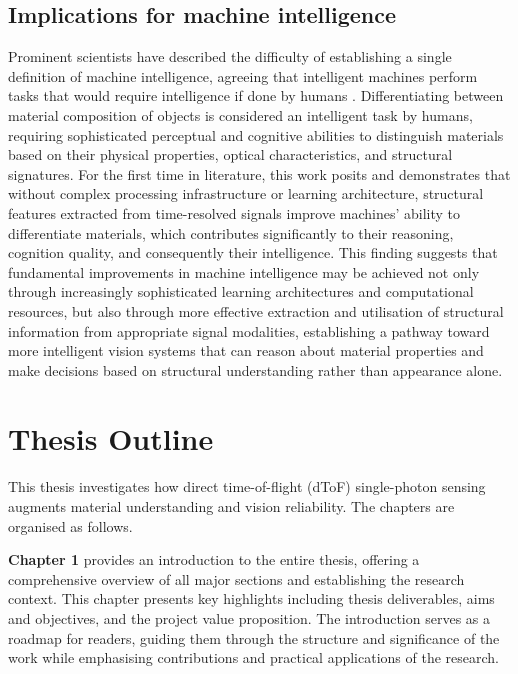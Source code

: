 \documentclass[12pt,a4paper,oneside]{report}
\let\oldsection\section
\renewcommand{\section}{\clearpage\oldsection}
\begin{document}
\subsection{Implications for machine intelligence}
Prominent scientists have described the difficulty of establishing a single definition of machine intelligence, agreeing that intelligent machines perform tasks that would require intelligence if done by humans \cite{minsky1986,chollet2019}. Differentiating between material composition of objects is considered an intelligent task by humans, requiring sophisticated perceptual and cognitive abilities to distinguish materials based on their physical properties, optical characteristics, and structural signatures. For the first time in literature, this work posits and demonstrates that without complex processing infrastructure or learning architecture, structural features extracted from time-resolved signals improve machines' ability to differentiate materials, which contributes significantly to their reasoning, cognition quality, and consequently their intelligence. This finding suggests that fundamental improvements in machine intelligence may be achieved not only through increasingly sophisticated learning architectures and computational resources, but also through more effective extraction and utilisation of structural information from appropriate signal modalities, establishing a pathway toward more intelligent vision systems that can reason about material properties and make decisions based on structural understanding rather than appearance alone.

\newpage
\section{Thesis Outline}
\label{sec:thesis_outline}

This thesis investigates how direct time-of-flight (dToF) single-photon sensing augments material understanding and vision reliability. The chapters are organised as follows.

\textbf{Chapter 1} provides an introduction to the entire thesis, offering a comprehensive overview of all major sections and establishing the research context. This chapter presents key highlights including thesis deliverables, aims and objectives, and the project value proposition. The introduction serves as a roadmap for readers, guiding them through the structure and significance of the work while emphasising contributions and practical applications of the research.
\end{document}
